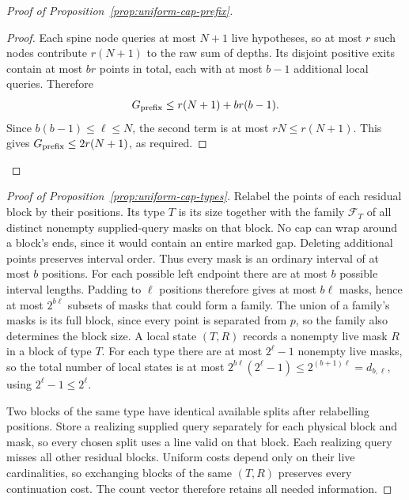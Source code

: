 \begin{proof}[Proof of Proposition~\ref{prop:uniform-cap-prefix}]
\begin{proof}
Each spine node queries at most $N+1$ live hypotheses, so at most
$r$ such nodes contribute $r(N+1)$ to the raw sum of depths.
Its disjoint positive exits contain at most $br$ points in total,
each with at most $b-1$ additional local queries. Therefore
\[
 G_{\rm prefix}\le r(N+1)+br(b-1).
\]
Since $b(b-1)\le\ell\le N$, the second term is at most
$rN\le r(N+1)$. This gives
$G_{\rm prefix}\le2r(N+1)$, as required.

\end{proof}
\end{proof}

\begin{proof}[Proof of Proposition~\ref{prop:uniform-cap-types}]
Relabel the points of each residual block by their positions. Its
type $T$ is its size together with the family $\mathcal F_T$ of all
distinct nonempty supplied-query masks on that block. No cap can
wrap around a block's ends, since it would contain an entire marked
gap. Deleting additional points preserves interval order. Thus every
mask is an ordinary interval of at most $b$ positions. For each possible left endpoint there are at most $b$ possible
interval lengths. Padding to $\ell$ positions therefore gives at
most $b\ell$ masks, hence at most $2^{b\ell}$ subsets of masks
that could form a family. The union of a family's masks is its full block,
since every point is separated from $p$, so the family also determines
the block size. A local
state $(T,R)$ records a nonempty live mask $R$ in a block of type $T$.
For each type there are at most $2^\ell-1$ nonempty live masks,
so the total number of local states is at most
$2^{b\ell}(2^\ell-1)\le2^{(b+1)\ell}=d_{b,\ell}$, using
$2^\ell-1\le2^\ell$.

Two blocks of the same type have identical available splits after
relabelling positions. Store a realizing supplied query separately for
each physical block and mask, so every chosen split uses a line valid
on that block. Each realizing query misses all other residual blocks.
Uniform costs depend only on their live
cardinalities, so exchanging blocks of the same $(T,R)$ preserves
every continuation cost. The count vector therefore retains all needed
information.

\end{proof}

